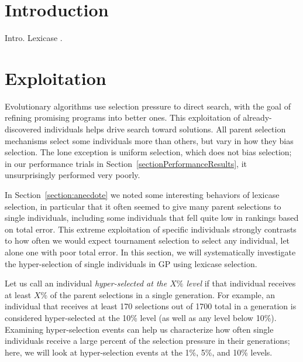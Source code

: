 \documentclass{sig-alternate-05-2015}
\newcommand{\definition}[1]{\textit{#1}}
\begin{document}


%
%

%
%
\printccsdesc



\section{Introduction}

Intro. Lexicase \cite{Helmuth:2014:ieeeTEC}.


\section{Exploitation}
\label{section:exploitation}

Evolutionary algorithms use selection pressure to direct search, with the goal of refining promising programs into better ones. This exploitation of already-discovered individuals helps drive search toward solutions. All parent selection mechanisms select some individuals more than others, but vary in how they bias selection. The lone exception is uniform selection, which does not bias selection; in our performance trials in Section~\ref{sectionPerformanceResults}, it unsurprisingly performed very poorly.

In Section~\ref{section:anecdote} we noted some interesting behaviors of lexicase selection, in particular that it often seemed to give many parent selections to single individuals, including some individuals that fell quite low in rankings based on total error. This extreme exploitation of specific individuals strongly contrasts to how often we would expect tournament selection to select any individual, let alone one with poor total error. In this section, we will systematically investigate the hyper-selection of single individuals in GP using lexicase selection.

Let us call an individual \definition{hyper-selected at the $X\%$ level} if that individual receives at least $X\%$ of the parent selections in a single generation. For example, an individual that receives at least 170 selections out of 1700 total in a generation is considered hyper-selected at the 10\% level (as well as any level below 10\%). Examining hyper-selection events can help us characterize how often single individuals receive a large percent of the selection pressure in their generations; here, we will %
look at hyper-selection events at the 1\%, 5\%, and 10\% levels.
\end{document}
